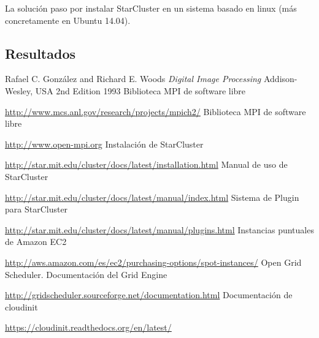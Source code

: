 \documentclass{article}
\begin{document}
	La solución paso por instalar StarCluster en un sistema basado en linux (más concretamente en Ubuntu 14.04).

\subsection{Resultados}

\clearpage

{\setlength{\parskip}{0mm} \listoftables } %
{\setlength{\parskip}{0mm} \listoffigures} %

\clearpage

\renewcommand{\bibname}{Referencias}
\begin{thebibliography}{99}
Rafael C. González and Richard E. Woods
\emph{Digital Image Processing}
Addison-Wesley, USA
2nd Edition
1993
Biblioteca MPI de software libre

\url{http://www.mcs.anl.gov/research/projects/mpich2/}
Biblioteca MPI de software libre

\url{http://www.open-mpi.org}
Instalación de StarCluster

\url{http://star.mit.edu/cluster/docs/latest/installation.html}
Manual de uso de StarCluster

\url{http://star.mit.edu/cluster/docs/latest/manual/index.html}
Sistema de Plugin para StarCluster

\url{http://star.mit.edu/cluster/docs/latest/manual/plugins.html}
Instancias puntuales de Amazon EC2

\url{http://aws.amazon.com/es/ec2/purchasing-options/spot-instances/}
Open Grid Scheduler. Documentación del Grid Engine

\url{http://gridscheduler.sourceforge.net/documentation.html}
Documentación de cloudinit

\url{https://cloudinit.readthedocs.org/en/latest/}
\end{thebibliography}
\end{document}
